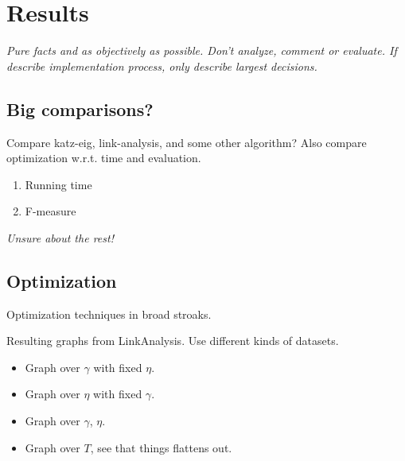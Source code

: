 \chapter{Results}\label{cha:Results}

\textit{Pure facts and as objectively as possible. Don't analyze, comment or evaluate.  If describe implementation process, only describe largest decisions.}


%


\newpage



\newpage


\newpage


\newpage


\newpage

\section{Big comparisons?}

Compare katz-eig, link-analysis, and some other algorithm?
Also compare optimization w.r.t. time and evaluation.

\begin{enumerate}
    \item Running time
    \item F-measure
\end{enumerate}


\textit{Unsure about the rest!}

\section{Optimization}\label{sec:res:opt}

Optimization techniques in broad stroaks.

Resulting graphs from LinkAnalysis. Use different kinds of datasets.

\begin{itemize}
    \item Graph over $\gamma$ with fixed $\eta$.
    \item Graph over $\eta$ with fixed $\gamma$.
    \item Graph over $\gamma$, $\eta$.
    \item Graph over $T$, see that things flattens out.
\end{itemize}

